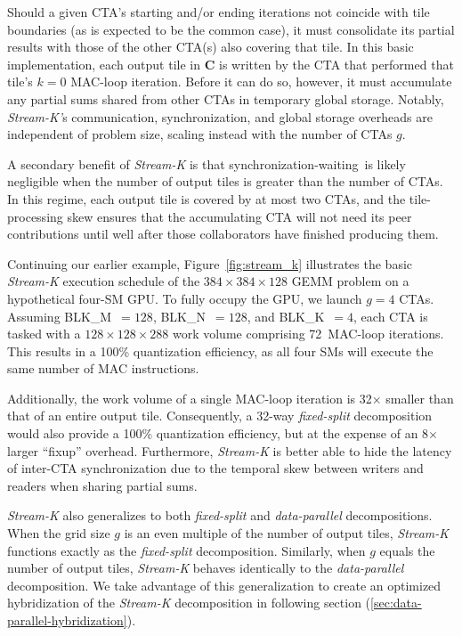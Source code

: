 Should a given CTA's starting and/or ending iterations not coincide with tile boundaries (as is expected to be the common case), it must consolidate its partial results with those of the other CTA(s) also covering that tile. In this basic implementation, each output tile in
\textbf{C} is written by the CTA that performed that tile's $k=0$ MAC-loop iteration. Before it can do so, however, it must accumulate any partial sums shared from other CTAs in temporary global storage. Notably, \emph{Stream-K'}s communication, synchronization, and global storage overheads are independent of problem size, scaling instead with the number of CTAs $g$.

A secondary benefit of \emph{Stream-K} is that synchronization-waiting~is likely negligible when the number of output tiles is greater than the number of CTAs. In this regime, each output tile is covered by at most two CTAs, and the tile-processing skew ensures that the accumulating CTA will not need its peer contributions until well after those collaborators have finished producing them.

Continuing our earlier example, Figure~\ref{fig:stream_k} illustrates the basic
\emph{Stream-K} execution schedule of the $384\times384\times128$ GEMM problem on a hypothetical four-SM GPU\@. To fully occupy the GPU, we launch $g=4$ CTAs. Assuming BLK\_M~$=128$, BLK\_N~$=128$, and BLK\_K~$=4$, each CTA is tasked with a $128\times128\times288$ work volume comprising 72~MAC-loop iterations. This results in a 100\% quantization efficiency, as all four SMs will execute the same number of MAC instructions.

Additionally, the work volume of a single MAC-loop iteration is 32$\times$
smaller than that of an entire output tile. Consequently, a 32-way
\emph{fixed-split} decomposition would also provide a 100\% quantization efficiency, but at the expense of an 8$\times$ larger ``fixup'' overhead. Furthermore, \emph{Stream-K} is better able to hide the latency of inter-CTA synchronization due to the temporal skew between writers and readers when sharing partial sums.

\emph{Stream-K} also generalizes to both \emph{fixed-split}
and \emph{data-parallel} decompositions. When the grid size $g$ is an even multiple of the number of output tiles, \emph{Stream-K}
functions exactly as the \emph{fixed-split} decomposition. Similarly, when $g$ equals the number of output tiles, \emph{Stream-K} behaves identically to the \emph{data-parallel} decomposition. We take advantage of this generalization to create an optimized hybridization of the \emph{Stream-K}
decomposition in following section (\ref{sec:data-parallel-hybridization}).

